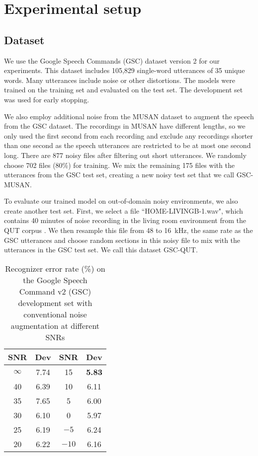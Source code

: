 \documentclass{article}
\begin{document}
\section{Experimental setup}
\subsection{Dataset}
We use the Google Speech Commands (GSC) dataset version 2 \cite{warden2018speech} for our experiments. This dataset includes 105,829 single-word utterances of 35 unique words. Many utterances include noise or other distortions. The models were trained on the training set and evaluated on the test set. The development set was used for early stopping. 

We also employ additional noise from the MUSAN dataset \cite{snyder2015musan} to augment the speech from the GSC dataset. The recordings in MUSAN have different lengths, so we only used the first second from each recording and exclude any recordings shorter than one second as the speech utterances are restricted to be at most one second long. There are 877 noisy files after filtering out short utterances. We randomly choose 702 files (80\%) for training. We mix the remaining 175 files with the utterances from the GSC test set, creating a new noisy test set that we call GSC-MUSAN. 

To evaluate our trained model on out-of-domain noisy environments, we also create another test set. First, we select a file ``HOME-LIVINGB-1.wav", which contains 40 minutes of noise recording in the living room environment from the QUT corpus \cite{dean2015qut}. We then resample this file from 48 to 16~kHz, the same rate as the GSC utterances and choose random sections in this noisy file to mix with the utterances in the GSC test set. We call this dataset GSC-QUT.




\begin{table}
  \caption{Recognizer error rate (\%) on the Google Speech Command v2 (GSC) development set with conventional noise augmentation at different SNRs}
  \label{tab:importantAug_result1}
  
  \begin{center}
\begin{tabular}{cc@{$\qquad\quad$}cc}
  \toprule
  SNR & Dev  & SNR & Dev  \\
  \midrule
  $\infty$ & 7.74 & 15 & \textbf{5.83} \\  
  40 & 6.39 & 10 & 6.11 \\
  35 & 7.65 & 5 & 6.00 \\
  30 & 6.10 & 0 & 5.97 \\
  25 & 6.19 & $-5$ & 6.24 \\
  20 & 6.22 &  $-10$ & 6.16 \\
  \bottomrule
    \end{tabular}
  \end{center}
\end{table}
\end{document}
